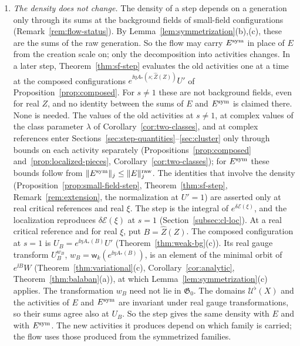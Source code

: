 \begin{remark}\label{rem:symmetrization-flow}
\begin{enumerate}[label=(\alph*)]
\item \emph{The density does not change.} The density of a step depends on a generation only through its sums at the background fields of small-field configurations (Remark~\ref{rem:flow-status}). By Lemma~\ref{lem:symmetrization}(b),(c), these are the sums of the raw generation. So the flow may carry $E^{\rm sym}$ in place of $E$ from the creation scale on; only the decomposition into activities changes. In a later step, Theorem~\ref{thm:sf-step} evaluates the old activities one at a time at the composed configurations $e^{\ii\eta A_*(s;\hat Z(Z))}U'$ of Proposition~\ref{prop:composed}. For $s\ne1$ these are not background fields, even for real $Z$, and no identity between the sums of $E$ and $E^{\rm sym}$ is claimed there. None is needed. The values of the old activities at $s\ne1$, at complex values of the class parameter $\lambda$ of Corollary~\ref{cor:two-classes}, and at complex references enter Sections~\ref{sec:step-quantities}--\ref{sec:cluster} only through bounds on each activity separately (Propositions~\ref{prop:composed} and~\ref{prop:localized-pieces}, Corollary~\ref{cor:two-classes}); for $E^{\rm sym}$ these bounds follow from $\|E^{\rm sym}\|_j\le\|E\|^{\rm raw}_j$. The identities that involve the density (Proposition~\ref{prop:small-field-step}, Theorem~\ref{thm:sf-step}, Remark~\ref{rem:extension}, the normalization at $U'=1$) are asserted only at real critical references and real $\xi$. The step is the integral of $e^{\delta\mathcal E(\xi)}$, and the localization reproduces $\delta\mathcal E(\xi)$ at $s=1$ (Section~\ref{subsec:cl-loc}). At a real critical reference and for real $\xi$, put $B=\hat Z(Z)$. The composed configuration at $s=1$ is $U_B=e^{\ii\eta A_*(B)}U'$ (Theorem~\ref{thm:weak-bg}(c)). Its real gauge transform $U_B^{w_B}$, $w_B=\mathsf w_k(e^{\ii\eta A_*(B)})$, is an element of the minimal orbit of $e^{\ii B}W$ (Theorem~\ref{thm:variational}(c), Corollary~\ref{cor:analytic}, Theorem~\ref{thm:balaban}(a)), at which Lemma~\ref{lem:symmetrization}(c) applies. The transformation $w_B$ need not lie in $\mathfrak G_0$. The domains $\mathcal U^\flat(X)$ and the activities of $E$ and $E^{\rm sym}$ are invariant under real gauge transformations, so their sums agree also at $U_B$. So the step gives the same density with $E$ and with $E^{\rm sym}$. The new activities it produces depend on which family is carried; the flow uses those produced from the symmetrized families.

\end{enumerate}
\end{remark}
